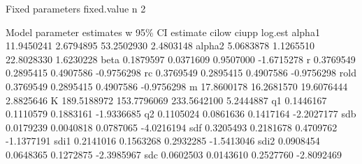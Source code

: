 \documentclass[
  letterpaper,
  DIV=11,
  numbers=noendperiod]{scrreprt}
\newenvironment{Shaded}{\begin{snugshade}}{\end{snugshade}}
\newcommand{\DecValTok}[1]{\textcolor[rgb]{0.68,0.00,0.00}{#1}}
\newcommand{\FloatTok}[1]{\textcolor[rgb]{0.68,0.00,0.00}{#1}}
\newcommand{\NormalTok}[1]{\textcolor[rgb]{0.00,0.23,0.31}{#1}}
\newcommand{\SpecialCharTok}[1]{\textcolor[rgb]{0.37,0.37,0.37}{#1}}
\begin{document}
\begin{Shaded}
\begin{Highlighting}[]
\NormalTok{Fixed parameters}
\NormalTok{   fixed.value  }
\NormalTok{ n           }\DecValTok{2}  

\NormalTok{Model parameter estimates w }\DecValTok{95}\NormalTok{\% CI }
\NormalTok{           estimate       cilow       ciupp    log.est  }
\NormalTok{ alpha1  }\FloatTok{11.9450241}   \FloatTok{2.6794895}  \FloatTok{53.2502930}  \FloatTok{2.4803148}  
\NormalTok{ alpha2   }\FloatTok{5.0683878}   \FloatTok{1.1265510}  \FloatTok{22.8028330}  \FloatTok{1.6230228}  
\NormalTok{ beta     }\FloatTok{0.1879597}   \FloatTok{0.0371609}   \FloatTok{0.9507000} \SpecialCharTok{{-}}\FloatTok{1.6715278}  
\NormalTok{ r        }\FloatTok{0.3769549}   \FloatTok{0.2895415}   \FloatTok{0.4907586} \SpecialCharTok{{-}}\FloatTok{0.9756298}  
\NormalTok{ rc       }\FloatTok{0.3769549}   \FloatTok{0.2895415}   \FloatTok{0.4907586} \SpecialCharTok{{-}}\FloatTok{0.9756298}  
\NormalTok{ rold     }\FloatTok{0.3769549}   \FloatTok{0.2895415}   \FloatTok{0.4907586} \SpecialCharTok{{-}}\FloatTok{0.9756298}  
\NormalTok{ m       }\FloatTok{17.8600178}  \FloatTok{16.2681570}  \FloatTok{19.6076444}  \FloatTok{2.8825646}  
\NormalTok{ K      }\FloatTok{189.5188972} \FloatTok{153.7796069} \FloatTok{233.5642100}  \FloatTok{5.2444887}  
\NormalTok{ q1       }\FloatTok{0.1446167}   \FloatTok{0.1110579}   \FloatTok{0.1883161} \SpecialCharTok{{-}}\FloatTok{1.9336685}  
\NormalTok{ q2       }\FloatTok{0.1105024}   \FloatTok{0.0861636}   \FloatTok{0.1417164} \SpecialCharTok{{-}}\FloatTok{2.2027177}  
\NormalTok{ sdb      }\FloatTok{0.0179239}   \FloatTok{0.0040818}   \FloatTok{0.0787065} \SpecialCharTok{{-}}\FloatTok{4.0216194}  
\NormalTok{ sdf      }\FloatTok{0.3205493}   \FloatTok{0.2181678}   \FloatTok{0.4709762} \SpecialCharTok{{-}}\FloatTok{1.1377191}  
\NormalTok{ sdi1     }\FloatTok{0.2141016}   \FloatTok{0.1563268}   \FloatTok{0.2932285} \SpecialCharTok{{-}}\FloatTok{1.5413046}  
\NormalTok{ sdi2     }\FloatTok{0.0908454}   \FloatTok{0.0648365}   \FloatTok{0.1272875} \SpecialCharTok{{-}}\FloatTok{2.3985967}  
\NormalTok{ sdc      }\FloatTok{0.0602503}   \FloatTok{0.0143610}   \FloatTok{0.2527760} \SpecialCharTok{{-}}\FloatTok{2.8092469}  
 

\end{Highlighting}
\end{Shaded}
\end{document}
